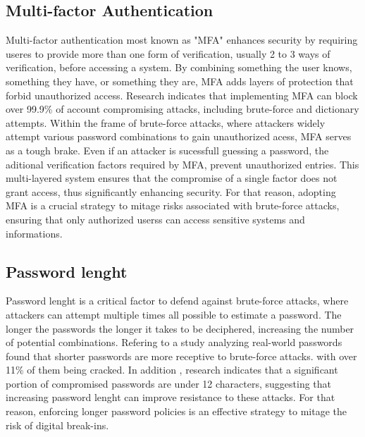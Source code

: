 \documentclass{comjnl}
\begin{document}
\subsection{Multi-factor Authentication}
Multi-factor authentication most known as "MFA" enhances security by requiring useres to provide more than one form of verification, usually 2 to 3 ways of verification, before accessing a system. By combining something the user knows, something they have, or something they are, MFA adds layers of protection that forbid unauthorized access. Research indicates that implementing MFA can block over 99.9\% of account compromising attacks, including brute-force and dictionary attempts.\cite{mfa_effectiveness} Within the frame of brute-force attacks, where attackers widely attempt various password combinations to gain unauthorized acess, MFA serves as a tough brake. Even if an attacker is sucessfull guessing a password, the aditional verification factors required by MFA, prevent unauthorized entries. This multi-layered system ensures that the compromise of a single factor does not grant access, thus significantly enhancing security.\cite{mfa_brute_force} For that reason, adopting MFA is a crucial strategy to mitage risks associated with brute-force attacks, ensuring that only authorized userss can access sensitive systems and informations.
\newpage
\subsection{Password lenght}
Password lenght is a critical factor to defend against brute-force attacks, where attackers can attempt multiple times all possible to estimate a password. The longer the passwords the longer it takes to be deciphered, increasing the number of potential combinations. Refering to a study analyzing real-world passwords found that shorter passwords are more receptive to brute-force attacks. with over 11\% of them being cracked. \cite{password_lenght} In addition , research indicates that a significant portion of compromised passwords are under 12 characters, suggesting that increasing password lenght can improve resistance to these attacks. \cite{specops} For that reason, enforcing longer password policies is an effective strategy to mitage the risk of digital break-ins. 
\end{document}

